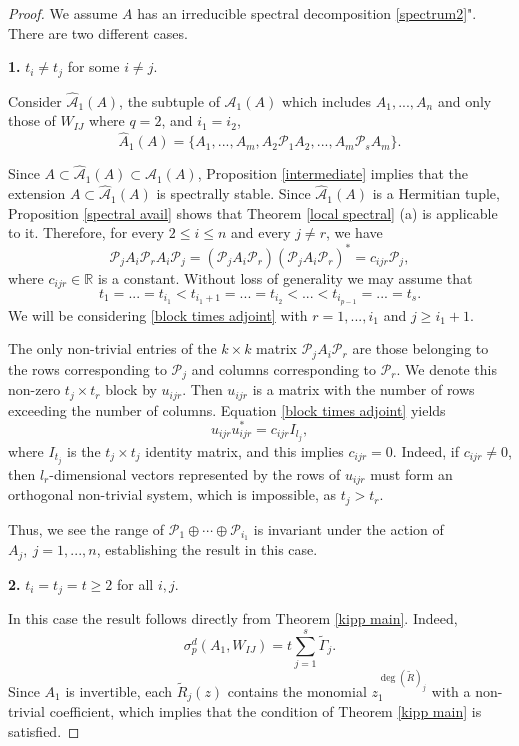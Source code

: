 \documentclass[draft, 12pt, reqno]{amsart}
\newcommand{\R}{{\mathbb R}}
\numberwithin{equation}{section}
\theoremstyle{plain}
\begin{document}
\begin{proof}
We assume $A$ has an irreducible spectral decomposition \eqref{spectrum2}".  There are two different cases.

\textbf{1.} $t_i\neq t_j$ for some $i\neq j$. 

Consider $\widehat{{\mathcal{A}}}_1(A)$, the subtuple of $\mathcal{A}_1(A)$ which includes $A_1,...,A_n$ and only those of $W_{IJ}$ where $q=2$, and $i_1=i_2$,
$$\widehat{A}_1(A)=\{ A_1,...,A_m, A_2\mathcal{P}_1A_2,...,A_m\mathcal{P}_sA_m\}. $$ 


 Since $A\subset \widehat{\mathcal{A}}_1(A)\subset \mathcal{A}_1(A)$, Proposition \ref{intermediate} implies that the extension $A\subset \widehat{\mathcal{A}}_1(A)$ is spectrally stable.
 Since $\widehat{\mathcal{A}}_1(A)$  is a Hermitian tuple, 
Proposition \ref{spectral avail} shows that Theorem \ref{local spectral} (a) is applicable to it. Therefore, for every $2\leq i\leq n$ and every $j\neq r$, we have
\begin{equation} \label{block times adjoint}
\mathcal{P}_jA_i\mathcal{P}_rA_i\mathcal{P}_j=(\mathcal{P}_jA_i\mathcal{P}_r)(\mathcal{P}_jA_i\mathcal{P}_r)^*=c_{ijr}\mathcal{P}_j,
\end{equation}
where $c_{ijr}\in \R$ is a constant. Without loss of generality we may assume that $$t_1=...=t_{i_1}<t_{i_1+1}=...=t_{i_2}<...<t_{i_{p-1}}=...=t_s.$$ 
We will be considering \eqref{block times adjoint} with $r=1,...,i_1$ and $j\geq i_1+1$. 

The only non-trivial entries of the $k\times k$ matrix $\mathcal{P}_jA_i\mathcal{P}_r$ are those belonging to the rows corresponding to $\mathcal{P}_j$ and columns corresponding to $\mathcal{P}_r$. We denote this non-zero $t_j\times t_r$ block by $u_{ijr}$. Then $u_{ijr}$ is a matrix with the number of rows exceeding the number of columns. Equation \eqref{block times adjoint} yields
$$ u_{ijr}u_{ijr}^*=c_{ijr}I_{l_j},$$
where $I_{t_j}$ is the $t_j\times t_j$ identity matrix, and this implies $c_{ijr}=0$. Indeed, if $c_{ijr}\neq 0$, then $l_r$-dimensional vectors represented by the rows of $u_{ijr}$ must form an orthogonal non-trivial system, which is impossible, as $t_j>t_r$. 

Thus, we see the range of $\mathcal{P}_1\oplus \cdots \oplus \mathcal{P}_{i_1}$ is invariant under the action of $A_j, \ j=1,...,n$, establishing the result in this case.

\vspace{.2cm}

\textbf{2.} $t_i=t_j=t\geq 2$ for all $i,j$.

\vspace{.2cm}

In this case the result follows directly from Theorem \ref{kipp main}. Indeed, 
$$\sigma_p^d(A_1, W_{IJ})=t \displaystyle \sum_{j=1}^s \widetilde{\Gamma}_j.$$
Since $A_1$ is invertible, each $\widetilde{R}_j(z)$ contains the monomial $z_1^{\deg(\widetilde{R})_j}$ with a  non-trivial coefficient, which implies that the condition of Theorem \ref{kipp main} is satisfied.
\end{proof}
\end{document}
